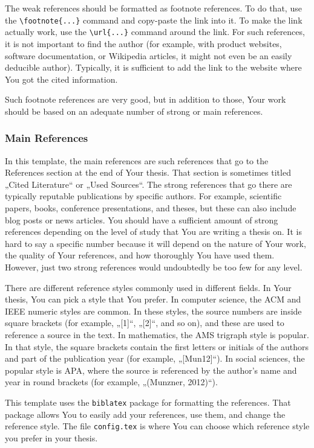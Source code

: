 The weak references should be formatted as footnote references. To do that, use the \verb|\footnote{...}| command and copy-paste the link into it. To make the link actually work, use the \verb|\url{...}| command around the link. For such references, it is not important to find the author (for example, with product websites, software documentation, or Wikipedia articles, it might not even be an easily deducible author). Typically, it is sufficient to add the link to the website where You got the cited information. 

Such footnote references are very good, but in addition to those, Your work should be based on an adequate number of strong or main references.

\subsubsection{Main References}
In this template, the main references are such references that go to the References section at the end of Your thesis. That section is sometimes titled „Cited Literature“ or „Used Sources“. The strong references that go there are typically reputable publications by specific authors. For example, scientific papers, books, conference presentations, and theses, but these can also include blog posts or news articles. You should have a sufficient amount of strong references depending on the level of study that You are writing a thesis on. It is hard to say a specific number because it will depend on the nature of Your work, the quality of Your references, and how thoroughly You have used them. However, just two strong references would undoubtedly be too few for any level.

There are different reference styles commonly used in different fields. In Your thesis, You can pick a style that You prefer. In computer science, the ACM and IEEE numeric styles are common. In these styles, the source numbers are inside square brackets (for example, „[1]“, „[2]“, and so on), and these are used to reference a source in the text. In mathematics, the AMS trigraph style is popular. In that style, the square brackets contain the first letters or initials of the authors and part of the publication year (for example, „[Mun12]“). In social sciences, the popular style is APA, where the source is referenced by the author’s name and year in round brackets (for example, „(Munzner, 2012)“).

This template uses the \verb|biblatex| package for formatting the references. That package allows You to easily add your references, use them, and change the reference style. The file \verb|config.tex| is where You can choose which reference style you prefer in your thesis.

